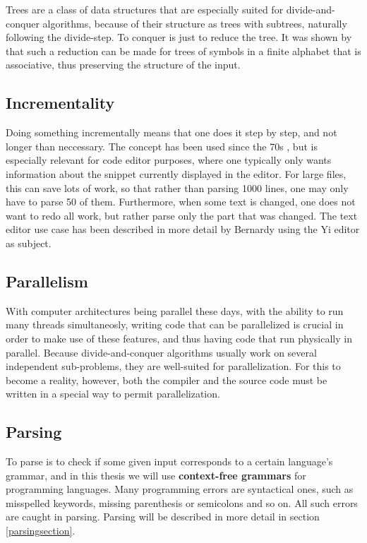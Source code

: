 \documentclass[a4paper,12pt,twosided]{report}
\renewcommand\cite{\citep}
\begin{document}
Trees are a class of data structures that are especially suited for 
divide-and-conquer algorithms, because of their structure as trees with
subtrees, naturally following the divide-step. To conquer is just to reduce the
tree. It was shown by \citet{parparsepaper} that such a reduction can be made
for trees of symbols in a finite alphabet that is associative, thus preserving
the structure of the input. 

\subsection{Incrementality}
Doing something incrementally means that one does it step by step, and not
longer than neccessary. The concept has been used since the 70s
\cite{incrementalpaper}, but is especially relevant for code editor purposes,
where one typically only wants information about the snippet currently displayed
in the editor. For large files, this can save lots of work, so that rather than
parsing 1000 lines, one may only have to parse 50 of them. Furthermore, when
some text is changed, one does not want to redo all work, but rather parse only
the part that was changed. The text editor use case has been described in more
detail by Bernardy \cite{lazyfunctional} using the Yi editor as subject. 

\subsection{Parallelism}
With computer architectures being parallel these days, with the ability to run
many threads simultaneosly, writing code that can be parallelized is crucial in
order to make use of these features, and thus having code that run physically in
parallel. Because divide-and-conquer algorithms usually work on several
independent sub-problems, they are well-suited for parallelization. For this to
become a reality, however, both the compiler and the source code must be written
in a special way to permit parallelization.

\subsection{Parsing}
To parse is to check if some given input corresponds to a certain language's
grammar, and in this thesis we will use \textbf{context-free grammars} for
programming languages. Many programming errors are syntactical ones, such as
misspelled keywords, missing parenthesis or semicolons and so on. All such
errors are caught in parsing. Parsing will be described in more detail in
section \ref{parsingsection}.
\end{document}
